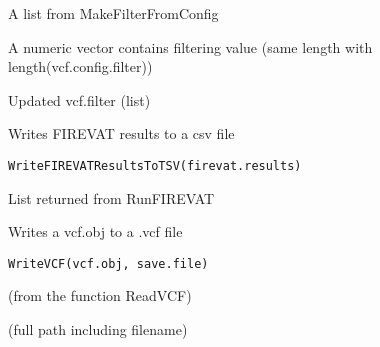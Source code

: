 \documentclass[letterpaper]{book}
\begin{document}
%
\begin{Arguments}
\begin{ldescription}
\item[\code{vcf.filter}] A list from MakeFilterFromConfig

\item[\code{param.values}] A numeric vector contains filtering value
(same length with length(vcf.config.filter))
\end{ldescription}
\end{Arguments}
%
\begin{Value}
Updated vcf.filter (list)
\end{Value}
%
\begin{Description}\relax
Writes FIREVAT results to a csv file
\end{Description}
%
\begin{Usage}
\begin{verbatim}
WriteFIREVATResultsToTSV(firevat.results)
\end{verbatim}
\end{Usage}
%
\begin{Arguments}
\begin{ldescription}
\item[\code{firevat.results}] List returned from RunFIREVAT
\end{ldescription}
\end{Arguments}
%
\begin{Description}\relax
Writes a vcf.obj to a .vcf file
\end{Description}
%
\begin{Usage}
\begin{verbatim}
WriteVCF(vcf.obj, save.file)
\end{verbatim}
\end{Usage}
%
\begin{Arguments}
\begin{ldescription}
\item[\code{vcf.obj}] (from the function ReadVCF)

\item[\code{save.file}] (full path including filename)
\end{ldescription}
\end{Arguments}
\printindex{}
\end{document}
